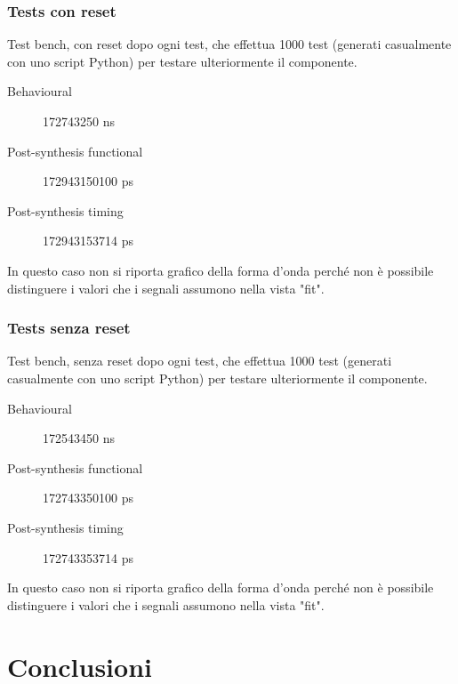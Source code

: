 \documentclass{article}
\begin{document}
\subsubsection{Tests con reset}
Test bench, con reset dopo ogni test, che effettua 1000 test (generati casualmente con uno script Python) per testare ulteriormente il componente.
\begin{description}
	\item[Behavioural] 172743250 ns
	\item[Post-synthesis functional] 172943150100 ps
	\item[Post-synthesis timing] 172943153714 ps
\end{description}
In questo caso non si riporta grafico della forma d'onda perché non è possibile distinguere i valori che i segnali assumono nella vista "fit".

\subsubsection{Tests senza reset}
Test bench, senza reset dopo ogni test, che effettua 1000 test (generati casualmente con uno script Python) per testare ulteriormente il componente.
\begin{description}
	\item[Behavioural] 172543450 ns
	\item[Post-synthesis functional] 172743350100 ps
	\item[Post-synthesis timing] 172743353714 ps
\end{description}
In questo caso non si riporta grafico della forma d'onda perché non è possibile distinguere i valori che i segnali assumono nella vista "fit".
\pagebreak

\section{Conclusioni}


\end{document}
